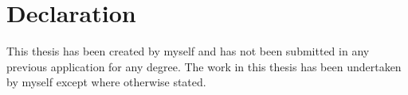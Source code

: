 
\chapter*{Declaration}

This thesis has been created by myself and has not been submitted in any previous application for any degree. The work in this thesis has been undertaken by myself except where otherwise stated. 

\pagebreak
